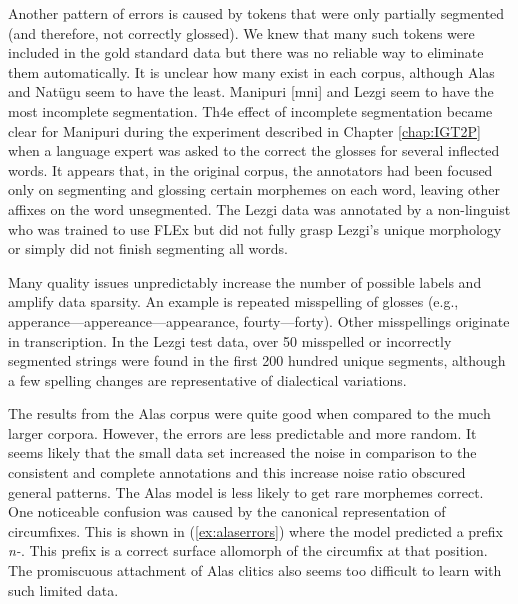 Another pattern of errors is caused by tokens that were only partially segmented (and therefore, not correctly glossed). We knew that many such tokens were included in the gold standard data but there was no reliable way to eliminate them automatically. It is unclear how many exist in each corpus, although Alas and Nat\"ugu seem to have the least. Manipuri [mni] and Lezgi seem to have the most incomplete segmentation. Th4e effect of incomplete segmentation became clear for Manipuri during the experiment described in Chapter \ref{chap:IGT2P} when a language expert was asked to the correct the glosses for several inflected words. It appears that, in the original corpus, the annotators had been focused only on segmenting and glossing certain morphemes on each word, leaving other affixes on the word unsegmented. 
The Lezgi data was annotated by a non-linguist who was trained to use FLEx but did not fully grasp Lezgi's unique morphology or simply did not finish segmenting all words. 

Many quality issues unpredictably increase the number of possible labels and amplify data sparsity. An example is
repeated misspelling of glosses (e.g., apperance---appereance---appearance, fourty---forty). Other misspellings originate in transcription. In the Lezgi test data, over 50 misspelled or incorrectly segmented strings were found in the first 200 hundred unique segments, although a few spelling changes are representative of dialectical variations.  


The results from the Alas corpus were quite good when compared to the much larger corpora. However, the errors are less predictable and more random. It seems likely that the small data set increased the noise in comparison to the consistent and complete annotations and this increase noise ratio obscured general patterns. 
The Alas model is less likely to get rare morphemes correct. 
One noticeable confusion was caused by the canonical representation of circumfixes. This is shown in (\ref{ex:alaserrors}) where the model predicted a prefix \textit{n-}. This prefix is a correct surface allomorph of the circumfix at that position. 
The promiscuous attachment of Alas clitics also seems too difficult to learn with such limited data.


